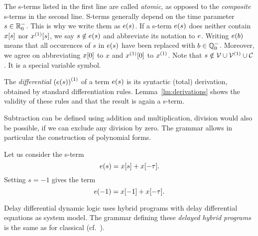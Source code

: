     The s-terms listed in the first line are called \emph{atomic}, as opposed to the \emph{composite} s-terms in the second line.
    S-terms generally depend on the time parameter $s\in\mathbb{R}^-_0$. This is why we write them as $e(s)$.
    If a s-term $e(s)$ does neither contain $x[s]$ nor $\Dx[s]$, we say $s\notin e(s)$ and abbreviate its notation to $e$.
    Writing $e(b)$ means that all occurences of $s$ in $e(s)$ have been replaced with $b\in\mathbb{Q}^-_0$.
    Moreover, we agree on abbreviating $x[0]$ to $x$ and $\Dx[0]$ to $\D{x}$.
    Note that $s\notin\allvars\cup\diffvars\cup\constants$. It is a special variable symbol.

    The \emph{differential} $\D{(\astrm(s))}$ of a term $e(s)$ is its syntactic (total) derivation, obtained by standard differentiation rules.
    Lemma~\ref{lm:derivations} shows the validity of these rules and that the result is again a s-term.

    Subtraction can be defined using addition and multiplication, division would also be possible, if we can exclude any division by zero. The grammar allows in particular the construction of polynomial forms.

    \begin{example}
        Let us consider the s-term
        \begin{equation*}
            e(s) = x[s] + x[-\tau].
        \end{equation*}
        Setting $s=-1$ gives the term
        \begin{equation*}
            e(-1) = x[-1] + x[-\tau].
        \end{equation*}
    \end{example}

    Delay differential dynamic logic uses hybrid programs with delay differential equations as system model. 
    The grammar defining these \emph{delayed hybrid programs} is the same as for classical \HPs (cf.~\cite{Platzer15Uniform}).


